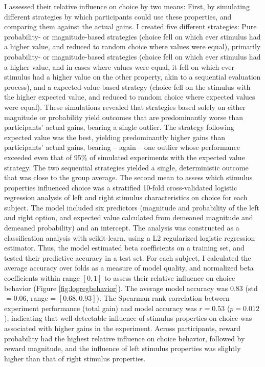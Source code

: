 I assessed their relative influence on choice by two means: First, by simulating different strategies by which participants could use these properties, and comparing them against the actual gains.
I created five different strategies: Pure probability- or magnitude-based strategies (choice fell on which ever stimulus had a higher value, and reduced to random choice where values were equal), primarily probability- or magnitude-based strategies (choice fell on which ever stimulus had a higher value, and in cases where values were equal, it fell on which ever stimulus had a higher value on the other property, akin to a sequential evaluation process), and a expected-value-based strategy (choice fell on the stimulus with the higher expected value, and reduced to random choice where expected values were equal).
These simulations revealed that strategies based solely on either magnitude or probability yield outcomes that are predominantly worse than participants' actual gains, bearing a single outlier.
The strategy following expected value was the best, yielding predominantly higher gains than participants' actual gains, bearing -- again -- one outlier whose performance exceeded even that of 95\% of simulated experiments with the expected value strategy.
The two sequential strategies yielded a single, deterministic outcome that was close to the group average.
The second mean to assess which stimulus properties influenced choice was a stratified 10-fold cross-validated logistic regression analysis of left and right stimulus characteristics on choice for each subject.
The model included six predictors (magnitude and probability of the left and right option, and expected value calculated from demeaned magnitude and demeaned probability) and an intercept.
The analysis was constructed as a classification analysis with scikit-learn, using a L2 regularized logistic regression estimator.
Thus, the model estimated beta coefficients on a training set, and tested their predictive accuracy in a test set.
For each subject, I calculated the average accuracy over folds as a measure of model quality, and normalized beta coefficients within range $[0, 1]$ to assess their relative influence on choice behavior (Figure \ref{fig:logregbehavior}).
The average model accuracy was $0.83$ (std$=0.06$, range = $[0.68, 0.93]$).
The Spearman rank correlation between experiment performance (total gain) and model accuracy was $r=0.53$ ($p=0.012$), indicating that well-detectable influence of stimulus properties on choice was associated with higher gains in the experiment.
Across participants, reward probability had the highest relative influence on choice behavior, followed by reward magnitude, and the influence of left stimulus properties was slightly higher than that of right stimulus properties.
